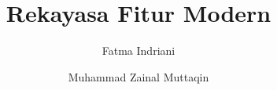 \title{Rekayasa Fitur Modern}
\author{Fatma Indriani \and Muhammad Zainal Muttaqin}
\newcommand{\booksubtitle}{Representasi Data untuk \emph{Machine Learning} dan \emph{Deep Learning}}

\newcommand{\maketitlepage}{%
  \begin{titlepage}
    \centering
    \vspace*{4cm}
    {\Huge\bfseries Rekayasa Fitur Modern\par}
    \vspace{1cm}
    {\large \booksubtitle\par}
    \vfill
    {\Large Fatma Indriani\par}
    \vspace{0.4cm}
    {\Large Muhammad Zainal Muttaqin\par}
    \vspace{2cm}
  \end{titlepage}
}
